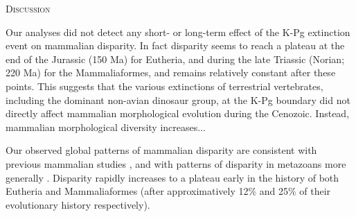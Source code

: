 \documentclass[12pt,letterpaper]{article}
\renewcommand{\section}[1]{%
\bigskip
\begin{center}
\begin{Large}
\normalfont\scshape #1
\medskip
\end{Large}
\end{center}}
\begin{document}
\section{Discussion}
Our analyses did not detect any short- or long-term effect of the K-Pg extinction event on mammalian disparity.
In fact disparity seems to reach a plateau at the end of the Jurassic (150 Ma) for Eutheria, and during the late Triassic (Norian; 220 Ma) for the Mammaliaformes, and remains relatively constant after these points.
This suggests that the various extinctions of terrestrial vertebrates, including the dominant non-avian dinosaur group, at the K-Pg boundary did not directly affect mammalian morphological evolution during the Cenozoic.
Instead, mammalian morphological diversity increases... %

Our observed global patterns of mammalian disparity are consistent with previous mammalian studies %
, and with patterns of disparity in metazoans more generally \citep[e.g.][]{Hughes20082013}. 
Disparity rapidly increases to a plateau early in the history of both Eutheria and Mammaliaformes (after approximatively 12\% and 25\% of their evolutionary history respectively).
\end{document}
